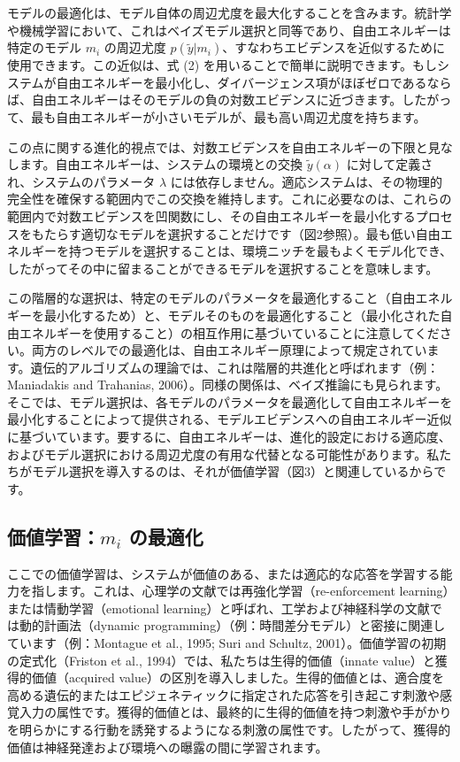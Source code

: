 \documentclass{article}
\begin{document}
モデルの最適化は、モデル自体の周辺尤度を最大化することを含みます。統計学や機械学習において、これはベイズモデル選択と同等であり、自由エネルギーは特定のモデル $m_i$ の周辺尤度 $p(\tilde{y}|m_i)$、すなわちエビデンスを近似するために使用できます。この近似は、式 (2) を用いることで簡単に説明できます。もしシステムが自由エネルギーを最小化し、ダイバージェンス項がほぼゼロであるならば、自由エネルギーはそのモデルの負の対数エビデンスに近づきます。したがって、最も自由エネルギーが小さいモデルが、最も高い周辺尤度を持ちます。

この点に関する進化的視点では、対数エビデンスを自由エネルギーの下限と見なします。自由エネルギーは、システムの環境との交換 $\tilde{y}(\alpha)$ に対して定義され、システムのパラメータ $\lambda$ には依存しません。適応システムは、その物理的完全性を確保する範囲内でこの交換を維持します。これに必要なのは、これらの範囲内で対数エビデンスを凹関数にし、その自由エネルギーを最小化するプロセスをもたらす適切なモデルを選択することだけです（図2参照）。最も低い自由エネルギーを持つモデルを選択することは、環境ニッチを最もよくモデル化でき、したがってその中に留まることができるモデルを選択することを意味します。

この階層的な選択は、特定のモデルのパラメータを最適化すること（自由エネルギーを最小化するため）と、モデルそのものを最適化すること（最小化された自由エネルギーを使用すること）の相互作用に基づいていることに注意してください。両方のレベルでの最適化は、自由エネルギー原理によって規定されています。遺伝的アルゴリズムの理論では、これは階層的共進化と呼ばれます（例：Maniadakis and Trahanias, 2006）。同様の関係は、ベイズ推論にも見られます。そこでは、モデル選択は、各モデルのパラメータを最適化して自由エネルギーを最小化することによって提供される、モデルエビデンスへの自由エネルギー近似に基づいています。要するに、自由エネルギーは、進化的設定における適応度、およびモデル選択における周辺尤度の有用な代替となる可能性があります。私たちがモデル選択を導入するのは、それが価値学習（図3）と関連しているからです。

\subsection{価値学習：$m_i$ の最適化}
ここでの価値学習は、システムが価値のある、または適応的な応答を学習する能力を指します。これは、心理学の文献では再強化学習（re-enforcement learning）または情動学習（emotional learning）と呼ばれ、工学および神経科学の文献では動的計画法（dynamic programming）（例：時間差分モデル）と密接に関連しています（例：Montague et al., 1995; Suri and Schultz, 2001）。価値学習の初期の定式化（Friston et al., 1994）では、私たちは生得的価値（innate value）と獲得的価値（acquired value）の区別を導入しました。生得的価値とは、適合度を高める遺伝的またはエピジェネティックに指定された応答を引き起こす刺激や感覚入力の属性です。獲得的価値とは、最終的に生得的価値を持つ刺激や手がかりを明らかにする行動を誘発するようになる刺激の属性です。したがって、獲得的価値は神経発達および環境への曝露の間に学習されます。
\end{document}
